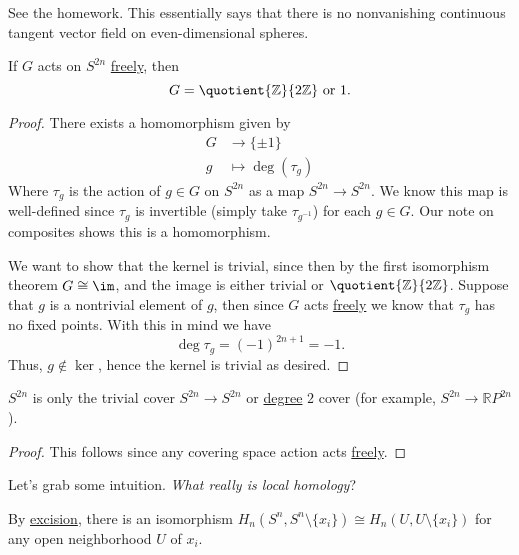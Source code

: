 
\begin{theorem}\label{thm:hairy-ball-theorem}
	See the homework. This essentially says that there is no nonvanishing continuous tangent vector field on even-dimensional spheres.
\end{theorem}

\begin{theorem}\label{thm:actions-on-spheres}
	If \(G\) acts on \(S^{2n}\) \hyperref[def:free-group]{freely}, then
	\[
		G = \quotient{\mathbb{Z}}{2\mathbb{Z}} \text{ or } 1.
	\]
\end{theorem}
\begin{proof}
	There exists a homomorphism given by
	\[
		\begin{split}
			G & \to \{\pm 1\}        \\
			g & \mapsto \deg(\tau_g)
		\end{split}
	\]
	Where \(\tau_g\) is the action of \(g \in G\) on \(S^{2n}\) as a map \(S^{2n} \to S^{2n}\). We know this map is well-defined since \(\tau_g\) is invertible
	(simply take \(\tau_{g^{-1}}\)) for each \(g \in G\). Our note on composites shows this is a homomorphism.

	We want to show that the kernel is trivial, since then by the first isomorphism theorem \(G \cong \im\), and the image is either trivial or
	\(\quotient{\mathbb{Z}}{2\mathbb{Z}}\). Suppose that \(g\) is a nontrivial element of \(g\), then since \(G\) acts \hyperref[def:free-group]{freely} we know that
	\(\tau_g\) has no fixed points. With this in mind we have
	\[
		\deg \tau_g = (-1)^{2n + 1} = - 1.
	\]
	Thus, \(g \not\in \ker\), hence the kernel is trivial as desired.
\end{proof}

\begin{corollary}
	\(S^{2n}\) is only the trivial cover \(S^{2n} \to S^{2n}\) or \hyperref[def:degree]{degree} \(2\) cover (for example, \(S^{2n} \to \mathbb{R}P^{2n}\)).
\end{corollary}
\begin{proof}
	This follows since any covering space action acts \hyperref[def:free-group]{freely}.
\end{proof}

\hr

Let's grab some intuition. \emph{What really is local homology}?

By \hyperref[thm:excision]{excision}, there is an isomorphism \(H_n(S^n, S^n \setminus \{x_i\}) \cong H_n(U, U \setminus \{x_i\})\) for any open
neighborhood \(U\) of \(x_i\).

